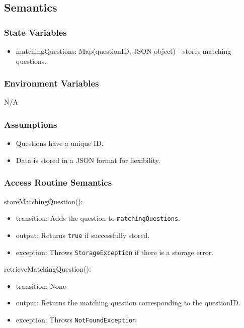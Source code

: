 \documentclass[12pt, titlepage]{article}
\begin{document}
\subsection{Semantics}

\subsubsection{State Variables}

\begin{itemize}
  \item matchingQuestions: Map(questionID, JSON object) - stores matching questions.
\end{itemize}

\subsubsection{Environment Variables}

N/A

\subsubsection{Assumptions}

\begin{itemize}
  \item Questions have a unique ID.
  \item Data is stored in a JSON format for flexibility.
\end{itemize}

\subsubsection{Access Routine Semantics}

\noindent storeMatchingQuestion():
\begin{itemize}
  \item transition: Adds the question to \texttt{matchingQuestions}.
  \item output: Returns \texttt{true} if successfully stored.
  \item exception: Throws \texttt{StorageException} if there is a storage error.
\end{itemize}

\noindent retrieveMatchingQuestion():
\begin{itemize}
  \item transition: None
  \item output: Returns the matching question corresponding to the questionID.
  \item exception: Throws \texttt{NotFoundException}
\end{itemize}
\end{document}
